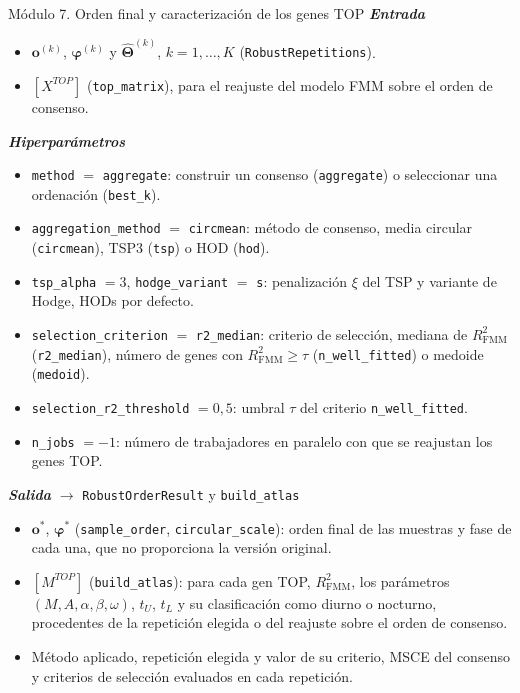 \documentclass[12pt, a4paper]{report}
\newcommand{\dato}[2]{{\boldmath\textcolor{#1}{#2}}}
\begin{document}
\begin{panel}{Módulo 7. Orden final y caracterización de los genes TOP}
\textit{\textbf{Entrada}}
\begin{itemize}[nosep,leftmargin=1.5em]
\item \dato{dK}{\(\mathbf{o}^{(k)}\), \(\boldsymbol{\varphi}^{(k)}\) y \(\widehat{\boldsymbol{\Theta}}^{(k)}\), \(k=1,\ldots,K\) (\texttt{RobustRepetitions})}.
\item \dato{dT}{\([X^{TOP}]\) (\texttt{top\_matrix})}, para el reajuste del modelo FMM sobre el orden de consenso.
\end{itemize}

\textit{\textbf{Hiperparámetros}}
\begin{itemize}[nosep,leftmargin=1.5em]
\item \texttt{method} \(=\) \texttt{aggregate}: construir un consenso (\texttt{aggregate}) o seleccionar una ordenación (\texttt{best\_k}).
\item \texttt{aggregation\_method} \(=\) \texttt{circmean}: método de consenso, media circular (\texttt{circmean}), TSP3 (\texttt{tsp}) o HOD (\texttt{hod}).
\item \texttt{tsp\_alpha} \(=3\), \texttt{hodge\_variant} \(=\) \texttt{s}: penalización \(\xi\) del TSP y variante de Hodge, HODs por defecto.
\item \texttt{selection\_criterion} \(=\) \texttt{r2\_median}: criterio de selección, mediana de \(R^2_{\mathrm{FMM}}\) (\texttt{r2\_median}), número de genes con \(R^2_{\mathrm{FMM}}\geq\tau\) (\texttt{n\_well\_fitted}) o medoide (\texttt{medoid}).
\item \texttt{selection\_r2\_threshold} \(=0{,}5\): umbral \(\tau\) del criterio \texttt{n\_well\_fitted}.
\item \texttt{n\_jobs} \(=-1\): número de trabajadores en paralelo con que se reajustan los genes TOP.
\end{itemize}

\textit{\textbf{Salida}} \(\rightarrow\) \texttt{RobustOrderResult} y \texttt{build\_atlas}
\begin{itemize}[nosep,leftmargin=1.5em]
\item \(\mathbf{o}^{*}\), \(\boldsymbol{\varphi}^{*}\) (\texttt{sample\_order}, \texttt{circular\_scale}): orden final de las muestras y fase de cada una, que no proporciona la versión original.
\item \([M^{TOP}]\) (\texttt{build\_atlas}): para cada gen TOP, \(R^2_{\mathrm{FMM}}\), los parámetros \((M,A,\alpha,\beta,\omega)\), \(t_U\), \(t_L\) y su clasificación como diurno o nocturno, procedentes de la repetición elegida o del reajuste sobre el orden de consenso.
\item Método aplicado, repetición elegida y valor de su criterio, MSCE del consenso y criterios de selección evaluados en cada repetición.
\end{itemize}
\end{panel}
\end{document}
